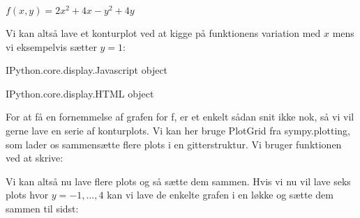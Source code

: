 \documentclass[letterpaper,10pt,english]{jupyterBook}
\begin{document}
\(f(x,y) = 2x^2+ 4x - y^2 + 4y\)

Vi kan altså lave et konturplot ved at kigge på funktionens variation med \(x\) mens vi eksempelvis sætter \(y = 1\):

\begin{sphinxVerbatim}[commandchars=\\\{\}]
   

                  

    
\end{sphinxVerbatim}

\begin{sphinxVerbatim}[commandchars=\\\{\}]
\PYGZlt{}IPython.core.display.Javascript object\PYGZgt{}
\end{sphinxVerbatim}

\begin{sphinxVerbatim}[commandchars=\\\{\}]
\PYGZlt{}IPython.core.display.HTML object\PYGZgt{}
\end{sphinxVerbatim}

For at få en fornemmelse af grafen for f, er et enkelt sådan snit ikke nok, så vi vil gerne lave en serie af konturplots. Vi kan her bruge PlotGrid fra sympy.plotting, som lader os sammensætte flere plots i en gitterstruktur. Vi bruger funktionen ved at skrive:

\begin{sphinxVerbatim}[commandchars=\\\{\}]
    
\end{sphinxVerbatim}

Vi kan altså nu lave flere plots og så sætte dem sammen. Hvis vi nu vil lave seks plots hvor \(y = -1,...,4\) kan vi lave de enkelte grafen i en løkke og sætte dem sammen til sidst:
\end{document}
